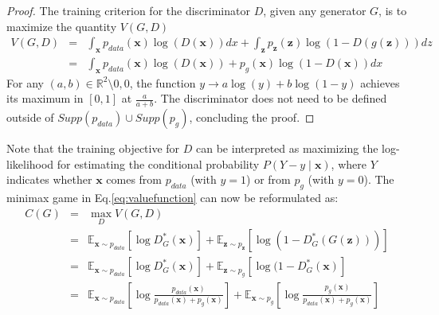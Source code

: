 \documentclass{article} %
\theoremstyle{definition}
\begin{document}
\begin{proof}
The training criterion for the discriminator $D$, given any generator $G$, is to maximize the quantity $V(G,D)$
\begin{eqnarray}
    V(G,D) &=& \int_{\textbf{x}}{p_{data}(\textbf{x})\log(D(\textbf{x}))dx} + \int_\textbf{z}{p_\textbf{z}(\textbf{z})\log(1-D(g(\textbf{z})))dz} \nonumber \\
    &=& \int_\textbf{x}{p_{data}(\textbf{x})\log(D(\textbf{x}))+p_g(\textbf{x})\log(1-D(\textbf{x}))dx} \nonumber
\end{eqnarray}
For any $(a,b)\in \mathbb{R}^2\setminus{0,0}$, the function $y \rightarrow a\log(y) + b\log(1-y)$ achieves its maximum in $[0,1]$ at $\frac{a}{a+b}$. The discriminator does not need to be defined outside of $Supp(p_{data}) \cup Supp(p_g)$, concluding the proof.
\end{proof}

Note that the training objective for $D$ can be interpreted as maximizing the log-likelihood for estimating the conditional probability $P(Y - y\mid\textbf{x})$, where $Y$ indicates whether $\textbf{x}$ comes from $p_{data}$ (with $y=1$) or from $p_g$ (with $y=0$). The minimax game in Eq.\ref{eq:valuefunction} can now be reformulated as: 
\begin{eqnarray}
    C(G) &=& \max_D V(G,D) \nonumber \\
    &=& \mathbb{E}_{\textbf{x}\sim p_{data}}[\log D_G^*(\textbf{x})] + \mathbb{E}_{\textbf{z} \sim p_\textbf{z}}[\log (1-D_G^*(G(\textbf{z})))] \nonumber \\
    &=& \mathbb{E}_{\textbf{x}\sim p_{data}}[\log D_G^*(\textbf{x})] + \mathbb{E}_{\textbf{z} \sim p_g}[\log (1-D_G^*(\textbf{x})] \nonumber \\
    &=& \mathbb{E}_{\textbf{x}\sim p_{data}}[\log \frac{p_{data}(\textbf{x})}{p_{data}(\textbf{x})+p_{g}(\textbf{x})}] + \mathbb{E}_{\textbf{x}\sim p_{g}}[\log \frac{p_{g}(\textbf{x})}{p_{data}(\textbf{x})+p_{g}(\textbf{x})}]
    \label{eq:4}
\end{eqnarray}
\end{document}
